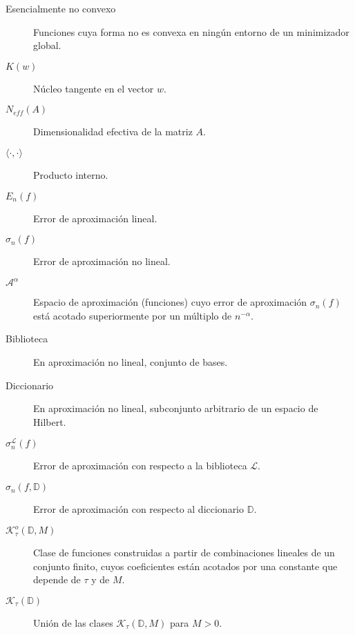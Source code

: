 \begin{description}
  \item[Esencialmente no convexo] Funciones cuya forma no es convexa en ningún entorno de un minimizador global.
  \item[$K(w)$] Núcleo tangente en el vector $w$.
  \item[$N_{eff}(A)$] Dimensionalidad efectiva de la matriz $A$.
  \item[$\langle \cdot, \cdot \rangle$] Producto interno.
  \item[$E_n(f)$] Error de aproximación lineal.
  \item[$\sigma_n(f)$] Error de aproximación no lineal.
  \item[$\mathcal{A}^{\alpha}$] Espacio de aproximación (funciones) cuyo error de aproximación $\sigma_n(f)$ está acotado superiormente por un múltiplo de $n^{-\alpha}$.
  \item[Biblioteca] En aproximación no lineal, conjunto de bases.
  \item[Diccionario] En aproximación no lineal, subconjunto arbitrario de un espacio de Hilbert.
  \item[$\sigma_n^{\mathcal{L}}(f)$] Error de aproximación con respecto a la biblioteca $\mathcal{L}$.
  \item[$\sigma_n(f, \mathbb{D})$] Error de aproximación con respecto al diccionario $\mathbb{D}$.
  \item[$\mathcal{K}_{\tau}^{o}(\mathbb{D}, M)$] Clase de funciones construidas a partir de combinaciones lineales de un conjunto finito, cuyos coeficientes están acotados por una constante que depende de $\tau$ y de $M$.
  \item[$\mathcal{K}_{\tau}(\mathbb{D})$] Unión de las clases $\mathcal{K}_{\tau}(\mathbb{D}, M)$ para $M > 0$.
\end{description}
\endinput

